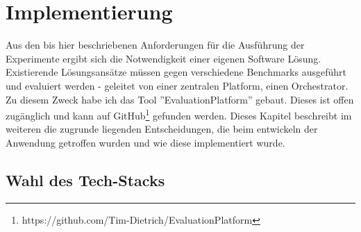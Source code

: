 \chapter{Implementierung}\label{ch:Implementierung}

Aus den bis hier beschriebenen Anforderungen für die Ausführung der Experimente ergibt sich die Notwendigkeit einer eigenen Software Lösung. Existierende Lösungsansätze müssen gegen verschiedene Benchmarks ausgeführt und evaluiert werden - geleitet von einer zentralen Platform, einen Orchestrator. Zu diesem Zweck habe ich das Tool ''EvaluationPlatform'' gebaut. Dieses ist offen zugänglich und kann auf GitHub\footnote{https://github.com/Tim-Dietrich/EvaluationPlatform} gefunden werden. Dieses Kapitel beschreibt im weiteren die zugrunde liegenden Entscheidungen, die beim entwickeln der Anwendung getroffen wurden und wie diese implementiert wurde. 

\section{Wahl des Tech-Stacks}\label{ch:Wahl des Tech-Stacks}




